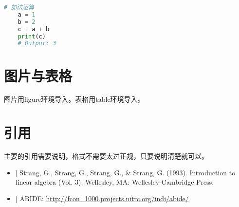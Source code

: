 \documentclass[a4paper,9pt]{extarticle}
\begin{document}
\begin{multicols*}{2}
\begin{lstlisting}[language=Python]
    # 加法运算
    a = 1
    b = 2
    c = a + b
    print(c)
    # Output: 3
    \end{lstlisting}
    
\section{图片与表格}
    图片用figure环境导入。表格用table环境导入。
\section*{引用}
    主要的引用需要说明，格式不需要太过正规，只要说明清楚就可以。
    \begin{itemize}
        \item [[1]] Strang, G., Strang, G., Strang, G., \& Strang, G. (1993). Introduction to linear algebra (Vol. 3). Wellesley, MA: Wellesley-Cambridge Press.
        
        \item [[2]] ABIDE: \url{http://fcon_1000.projects.nitrc.org/indi/abide/}
    \end{itemize}

\end{multicols*}
\end{document}

